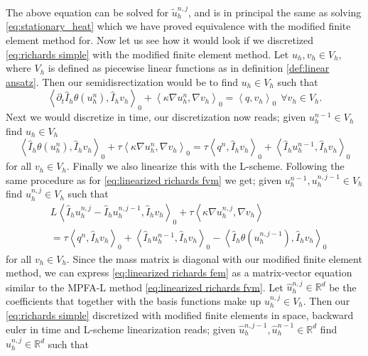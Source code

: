 \documentclass[../Main/main.tex]{subfiles}
\begin{document}
	The above equation can be solved for $\tilde{u}_h^{n,j}$, and is in principal the same as solving \eqref{eq:stationary_heat} which we have proved equivalence with the modified finite element method for.
	Now let us see how it would look if we discretized \eqref{eq:richards simple} with the modified finite element method. Let $u_h, v_h\in V_h$, where $V_h$ is defined as piecewise linear functions as in definition \ref{def:linear ansatz}. Then our semidisrectization would be to find $u_h \in V_h$ such that
	\begin{equation}
		\left \langle \partial_t\hat{I}_h \theta(u_h^n),\hat{I}_h v_h \right \rangle_0 + \left \langle \kappa \nabla u^n_h, \nabla v_h \right \rangle_0 = \left \langle q,v_h \right \rangle_0 \ \ \forall v_h \in V_h.
	\end{equation}
	Next we would discretize in time, our discretization now reads; given $u_h^{n-1} \in V_h$ find $u_h \in V_h$
	\begin{equation}
		\left \langle \hat{I}_h \theta(u_h^n),\hat{I}_h v_h \right \rangle_0 +\tau \left \langle \kappa \nabla u^n_h, \nabla v_h \right \rangle_0 = \tau \left \langle q^n,\hat{I}_h v_h \right \rangle_0 + \left \langle \hat{I}_h u_h^{n-1},\hat{I}_h v_h \right \rangle_0
	\end{equation}
	for all $v_h \in V_h$. Finally we also linearize this with the L-scheme. Following the same procedure as for \eqref{eq:linearized richards fvm} we get; given  $u_h^{n-1},u_h^{n,j-1} \in V_h$ find $u_h^{n,j} \in V_h$ such that
	\begin{equation}\label{eq:linearized richards fem}
		\begin{aligned}
			&L \left \langle \hat{I}_h u^{n,j}_h -  \hat{I}_h u^{n,j-1}_h,\hat{I}_h v_h \right \rangle_0 + \tau \left \langle \kappa \nabla u^{n,j}_h,\nabla v_h \right \rangle \\&=\tau \left \langle q^n,\hat{I}_h v_h \right \rangle_0 + \left \langle \hat{I}_h u_h^{n-1},\hat{I}_h v_h \right \rangle_0 -\left \langle \hat{I}_h \theta(u^{n,j-1}_h),\hat{I}_h v_h \right \rangle_0
		\end{aligned}
	\end{equation}
	for all $v_h \in V_h$. Since the mass matrix is diagonal with our modified finite element method, we can express \eqref{eq:linearized richards fem} as a matrix-vector equation similar to the MPFA-L method \eqref{eq:linearized richards fvm}. Let $\hat{u}_h^{n,j} \in \mathbb{R}^d$ be the coefficients that together with the basis functions make up $u_h^{n,j} \in V_h$. Then our \eqref{eq:richards simple} discretized with modified finite elements in space, backward euler in time and L-scheme linearization reads; given $\hat{u}_h^{n,j-1},\hat{u}_h^{n-1} \in \mathbb{R}^d$ find  $\hat{u}_h^{n,j} \in \mathbb{R}^d$ such that 
\end{document}
